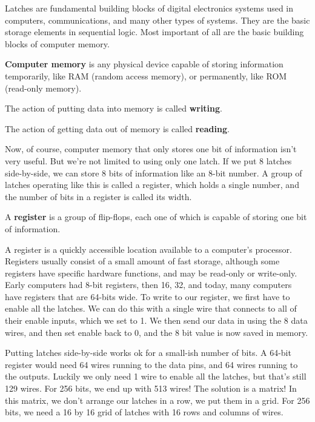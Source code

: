Latches are fundamental building blocks of digital electronics systems used in computers, communications, and many
other types of systems. They are the basic storage elements in sequential logic. Most important of all are the basic
building blocks of computer memory.

\textbf{Computer memory} is any physical device capable of storing information temporarily, like RAM (random access
memory), or permanently, like ROM (read-only memory).
\ed

\bd[Writing]
The action of putting data into memory is called \textbf{writing}.
\ed

\bd[Reading]
The action of getting data out of memory is called \textbf{reading}.
\ed

Now, of course, computer memory that only stores one bit of information isn't very useful. But we're not limited to
using only one latch. If we put 8 latches side-by-side, we can store 8 bits of information like an 8-bit number. A
group of latches operating like this is called a register, which holds a single number, and the number of bits in a
register is called its width.

\bd[Register]
A \textbf{register} is a group of flip-flops, each one of which is capable of storing one bit of information.
\ed

A register is a quickly accessible location available to a computer's processor. Registers usually consist of a small
amount of fast storage, although some registers have specific hardware functions, and may be read-only or write-only.
Early computers had 8-bit registers, then 16, 32, and today, many computers have registers that are 64-bits wide. To
write to our register, we first have to enable all the latches. We can do this with a single wire that connects to
all of their enable inputs, which we set to 1. We then send our data in using the 8 data wires, and then set enable
back to 0, and the 8 bit value is now saved in memory.


Putting latches side-by-side works ok for a small-ish number of bits. A 64-bit register would need 64 wires running
to the data pins, and 64 wires running to the outputs. Luckily we only need 1 wire to enable all the latches, but
that's still 129 wires. For 256 bits, we end up with 513 wires! The solution is a matrix! In this matrix, we don't
arrange our latches in a row, we put them in a grid. For 256 bits, we need a 16 by 16 grid of latches with 16 rows
and columns of wires.

